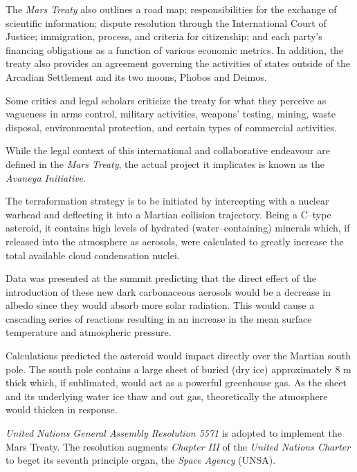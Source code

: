 The {\it Mars Treaty} also outlines a road map; responsibilities for the exchange of scientific information; dispute resolution through the International Court of Justice; immigration, process, and criteria for citizenship; and each party's financing obligations as a function of various economic metrics. In addition, the treaty also provides an agreement governing the activities of states outside of the Arcadian Settlement and its two moons, Phobos and Deimos. 

Some critics and legal scholars criticize the treaty for what they perceive as vagueness in arms control, military activities, weapons' testing, mining, waste disposal, environmental protection, and certain types of commercial activities.

While the legal context of this international and collaborative endeavour are defined in the {\it Mars Treaty}, the actual project it implicates is known as the {\it Avaneya Initiative}.

The terraformation strategy is to be initiated by intercepting  with a nuclear warhead and deflecting it into a Martian collision trajectory. Being a C--type asteroid, it contains high levels of hydrated (water--containing) minerals which, if released into the atmosphere as aerosols, were calculated to greatly increase the total available cloud condensation nuclei.

Data was presented at the summit predicting that the direct effect of the introduction of these new dark carbonaceous aerosols would be a decrease in albedo since they would absorb more solar radiation. This would cause a cascading series of reactions resulting in an increase in the mean surface temperature and atmospheric pressure.

Calculations predicted the asteroid would impact directly over the Martian south pole. The south pole contains a large sheet of buried  (dry ice) approximately 8 m thick which, if sublimated, would act as a powerful greenhouse gas. As the sheet and its underlying water ice thaw and out gas, theoretically the atmosphere would thicken in response.
\StopTimelineDate

{\it United Nations General Assembly Resolution 5571} is adopted to implement the Mars Treaty. The resolution augments {\it Chapter III} of the {\it United Nations Charter} to beget its seventh principle organ, the {\it Space Agency} (UNSA).

